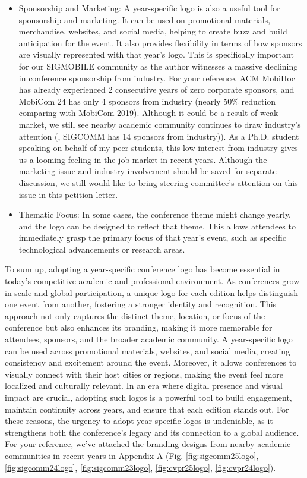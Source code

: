\documentclass[sigconf, 10pt]{acmart}
\begin{document}
\begin{itemize}[leftmargin=*]
	\item Sponsorship and Marketing: A year-specific logo is also a useful tool for sponsorship and marketing. It can be used on promotional materials, merchandise, websites, and social media, helping to create buzz and build anticipation for the event. It also provides flexibility in terms of how sponsors are visually represented with that year’s logo. This is specifically important for our SIGMOBILE community as the author witnesses a massive declining in conference sponsorship from industry. For your reference, ACM MobiHoc has already experienced 2 consecutive years of zero corporate sponsors, and MobiCom 24 has only 4 sponsors from industry (nearly 50\% reduction comparing with MobiCom 2019). Although it could be a result of weak market, we still see nearby academic community continues to draw industry's attention (\eg, SIGCOMM has 14 sponsors from industry)). As a Ph.D. student speaking on behalf of my peer students, this low interest from industry gives us a looming feeling in the job market in recent years. Although the marketing issue and industry-involvement should be saved for separate discussion, we still would like to bring steering committee's attention on this issue in this petition letter.
	
	\item Thematic Focus: In some cases, the conference theme might change yearly, and the logo can be designed to reflect that theme. This allows attendees to immediately grasp the primary focus of that year’s event, such as specific technological advancements or research areas.
\end{itemize}
To sum up, adopting a year-specific conference logo has become essential in today's competitive academic and professional environment. As conferences grow in scale and global participation, a unique logo for each edition helps distinguish one event from another, fostering a stronger identity and recognition. This approach not only captures the distinct theme, location, or focus of the conference but also enhances its branding, making it more memorable for attendees, sponsors, and the broader academic community. A year-specific logo can be used across promotional materials, websites, and social media, creating consistency and excitement around the event. Moreover, it allows conferences to visually connect with their host cities or regions, making the event feel more localized and culturally relevant. In an era where digital presence and visual impact are crucial, adopting such logos is a powerful tool to build engagement, maintain continuity across years, and ensure that each edition stands out. For these reasons, the urgency to adopt year-specific logos is undeniable, as it strengthens both the conference's legacy and its connection to a global audience. For your reference, we've attached the branding designs from nearby academic communities in recent years in Appendix A (Fig. \ref{fig:sigcomm25logo}, \ref{fig:sigcomm24logo}, \ref{fig:sigcomm23logo}, \ref{fig:cvpr25logo}, \ref{fig:cvpr24logo}).
\end{document}
